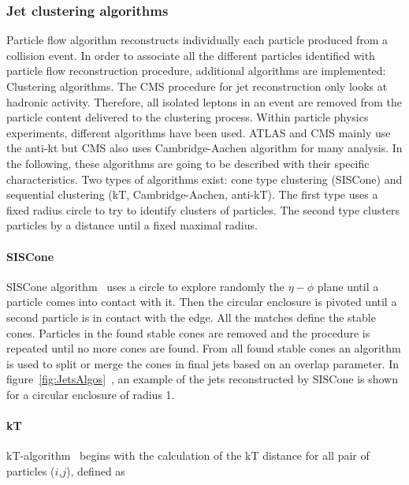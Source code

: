 \subsubsection{Jet clustering algorithms}

Particle flow algorithm reconstructs individually each particle produced from a collision event. In order to associate all the different particles identified with particle flow reconstruction procedure, additional algorithms are implemented: Clustering algorithms. The CMS procedure for jet reconstruction only looks at hadronic activity. Therefore, all isolated leptons in an event are removed from the particle content delivered to the clustering process. Within particle physics experiments, different algorithms have been used. ATLAS and CMS mainly use the anti-kt but CMS also uses Cambridge-Aachen algorithm for many analysis. In the following, these algorithms are going to be described with their specific characteristics. Two types of algorithms exist: cone type clustering (SISCone) and sequential clustering (kT, Cambridge-Aachen, anti-kT). The first type uses a fixed radius circle to try to identify clusters of particles. The second type clusters particles by a distance until a fixed maximal radius. 

\paragraph{SISCone}

SISCone algorithm~\cite{Salam:2007xv} uses a circle to explore randomly the $\eta-\phi$ plane until a particle comes into contact with it. Then the circular enclosure is pivoted until a second particle is in contact with the edge. All the matches define the stable cones. Particles in the found stable cones are removed and the procedure is repeated until no more cones are found. From all found stable cones an algorithm is used to split or merge the cones in final jets based on an overlap parameter. In figure~\ref{fig:JetsAlgos}~\cite{Cacciari:2008gp}, an example of the jets reconstructed by SISCone is shown for a circular enclosure of radius 1. 

\paragraph{kT}

kT-algorithm~\cite{Ellis:1993tq} begins with the calculation of the kT distance for all pair of particles ($i$,$j$), defined as

